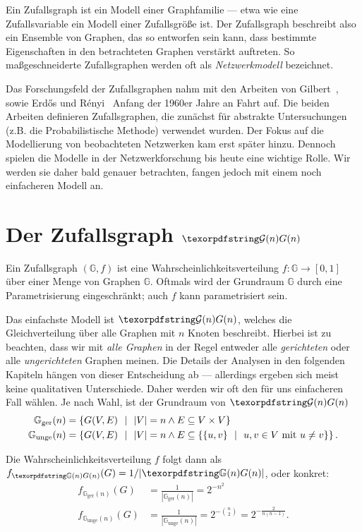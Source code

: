Ein Zufallsgraph ist ein Modell einer Graphfamilie --- etwa wie eine Zufallsvariable ein Modell einer Zufallsgröße ist.
Der Zufallsgraph beschreibt also ein Ensemble von Graphen, das so entworfen sein kann, dass bestimmte Eigenschaften in den betrachteten Graphen verstärkt auftreten.
So maßgeschneiderte Zufallsgraphen werden oft als \emph{Netzwerkmodell} bezeichnet.

Das Forschungsfeld der Zufallsgraphen nahm mit den Arbeiten von Gilbert~\cite{gilbert_1959}, sowie Erd\H{o}s und R\'enyi~\cite{erdos_renyi_1960} Anfang der 1960er Jahre an Fahrt auf.
Die beiden Arbeiten definieren Zufallsgraphen, die zunächst für abstrakte Untersuchungen (z.B. die Probabilistische Methode) verwendet wurden.
Der Fokus auf die Modellierung von beobachteten Netzwerken kam erst später hinzu.
Dennoch spielen die Modelle in der Netzwerkforschung bis heute eine wichtige Rolle.
Wir werden sie daher bald genauer betrachten, fangen jedoch mit einem noch einfacheren Modell an.

\section{Der Zufallsgraph $\Gn$}
Ein Zufallsgraph $(\mathbb G, f)$ ist eine Wahrscheinlichkeitsverteilung $f\colon \mathbb G \to [0, 1]$ über einer Menge von Graphen $\mathbb G$.
Oftmals wird der Grundraum $\mathbb G$ durch eine Parametrisierung eingeschränkt; auch $f$ kann parametrisiert sein.

Das  einfachste Modell ist $\Gn$, welches die Gleichverteilung über alle Graphen mit $n$ Knoten beschreibt.
Hierbei ist zu beachten, dass wir mit \emph{alle Graphen} in der Regel entweder alle \emph{gerichteten} oder alle \emph{ungerichteten} Graphen meinen.
Die Details der Analysen in den folgenden Kapiteln hängen von dieser Entscheidung ab --- allerdings ergeben sich meist keine qualitativen Unterschiede.
Daher werden wir oft den für uns einfacheren Fall wählen.
Je nach Wahl, ist der Grundraum von $\Gn$
\begin{align}
    \mathbb G_\text{ger}(n)  & =
    \left\{ G(V,E) \ \ \middle|\ \ |V| = n \land E \subseteq V \times V \right\} \\\label{eq:gerichtet_gn}
    \mathbb G_\text{unge}(n) & =
    \left\{ G(V,E) \ \ \middle|\ \ |V| = n \land  E \subseteq \left\{ \left\{u,v\right\} \ \ \middle|\ \ u,v \in V \text{ mit } u \ne v \right\} \right\}.
\end{align}

\noindent Die Wahrscheinlichkeitsverteilung $f$ folgt dann als $f_{\gGn}(G) = 1 / | \gGn |$, oder konkret:
\begin{align}
    f_{\mathbb G_\text{ger}(n)}(G)  & =  \frac{1}{| \mathbb G_\text{ger}(n) |} = 2^{-n^2}\label{eq:gleichverteilt_gerichtet_gn} \\
    f_{\mathbb G_\text{unge}(n)}(G) & =  \frac{1}{| \mathbb G_\text{unge}(n) |} = 2^{-\binom n 2} = 2^{-\frac{2}{n(n-1)}}.
\end{align}

